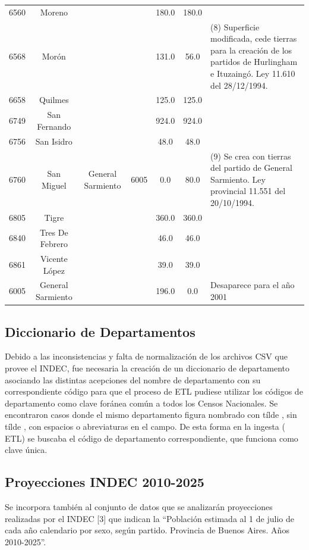\documentclass{article}
\theoremstyle{mytheoremstyle}
\theoremstyle{mytheoremstyle}
\theoremstyle{myproblemstyle}
\begin{document}
\begin{table}[htbp]
\begin{tabular}{|c|c|c|c|c|c|p{5cm}|}
        6560 & Moreno              &&& 180.0             & 180.0 & \\
        6568 & Morón                &&& 131.0             & 56.0  & (8) Superficie  modificada, cede tierras para la creación de los partidos de Hurlingham e Ituzaingó. Ley 11.610 del 28/12/1994.\\
        6658 & Quilmes            && & 125.0             & 125.0 &       \\
        6749 & San Fernando       && & 924.0             & 924.0 &    \\
        6756 & San Isidro         && & 48.0              & 48.0  &    \\
        6760 & San Miguel          & General Sarmiento & 6005  & 0.0 & 80.0 & (9) Se crea con tierras del partido de General Sarmiento. Ley provincial 11.551 del 20/10/1994. \\
        6805 & Tigre            &&   & 360.0             & 360.0 &     \\
        6840 & Tres De Febrero   &&  & 46.0              & 46.0  &      \\
        6861 & Vicente López     &&  & 39.0              & 39.0  &  \\
        6005 & General Sarmiento  && & 196.0             & 0.0   & Desaparece para el año 2001   \\        
     \hline
    \end{tabular}
    \label{tab:DimDepto}
\end{table}

\subsection{Diccionario de Departamentos  } 
Debido a las inconsistencias y falta de normalización de los archivos CSV que provee el INDEC, fue necesaria la creación de un diccionario de departamento asociando las distintas acepciones del nombre de departamento con su correspondiente código para que el proceso de ETL pudiese utilizar los códigos de departamento como clave foránea común a todos los Censos Nacionales. Se encontraron casos donde el mismo departamento figura nombrado con tílde ,  
sin tílde , con espacios o abreviaturas en el campo. De esta forma en la ingesta ( ETL) se buscaba el código de departamento correspondiente, que 
funciona como clave única.

\subsection{Proyecciones INDEC 2010-2025  }
Se incorpora también al conjunto de datos que se analizarán proyecciones realizadas por el INDEC [3] que indican la “Población estimada al 1 de julio de
 cada año calendario por sexo, según partido. Provincia de Buenos Aires. Años 2010-2025”.
\end{document}
